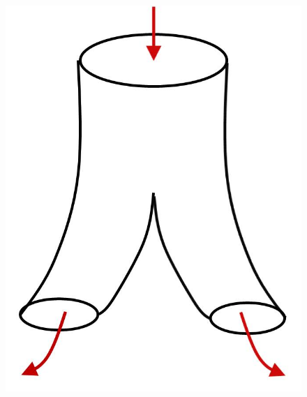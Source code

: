 \documentclass[a4paper,11pt,notitlepage]{report}
\theoremstyle{definition}
\begin{document}
\begin{figure}[h]
\begin{minipage}[b]{4cm}{\includegraphics[scale=0.4]{images/Stringtheorie.jpg}}\end{minipage}
\end{figure}
\end{document}
